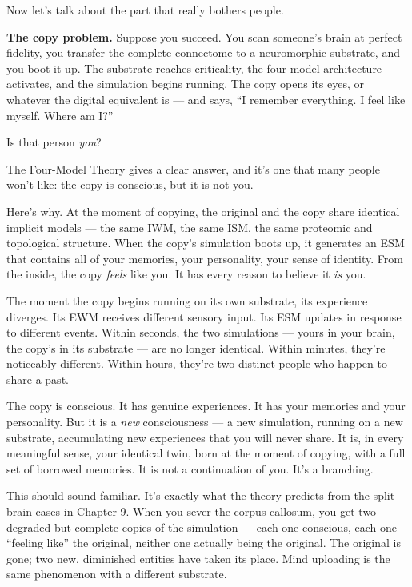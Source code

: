 \documentclass[11pt, twoside, openright]{book}
\begin{document}
Now let's talk about the part that really bothers people.

\textbf{The copy problem.} Suppose you succeed. You scan someone's brain at perfect fidelity, you transfer the complete connectome to a neuromorphic substrate, and you boot it up. The substrate reaches criticality, the four-model architecture activates, and the simulation begins running. The copy opens its eyes, or whatever the digital equivalent is --- and says, ``I remember everything. I feel like myself. Where am I?''

Is that person \textit{you}?

The Four-Model Theory gives a clear answer, and it's one that many people won't like: the copy is conscious, but it is not you.

Here's why. At the moment of copying, the original and the copy share identical implicit models --- the same IWM, the same ISM, the same proteomic and topological structure. When the copy's simulation boots up, it generates an ESM that contains all of your memories, your personality, your sense of identity. From the inside, the copy \textit{feels} like you. It has every reason to believe it \textit{is} you.

The moment the copy begins running on its own substrate, its experience diverges. Its EWM receives different sensory input. Its ESM updates in response to different events. Within seconds, the two simulations --- yours in your brain, the copy's in its substrate --- are no longer identical. Within minutes, they're noticeably different. Within hours, they're two distinct people who happen to share a past.

The copy is conscious. It has genuine experiences. It has your memories and your personality. But it is a \textit{new} consciousness --- a new simulation, running on a new substrate, accumulating new experiences that you will never share. It is, in every meaningful sense, your identical twin, born at the moment of copying, with a full set of borrowed memories. It is not a continuation of you. It's a branching.

This should sound familiar. It's exactly what the theory predicts from the split-brain cases in Chapter 9. When you sever the corpus callosum, you get two degraded but complete copies of the simulation --- each one conscious, each one ``feeling like'' the original, neither one actually being the original. The original is gone; two new, diminished entities have taken its place. Mind uploading is the same phenomenon with a different substrate.
\end{document}
